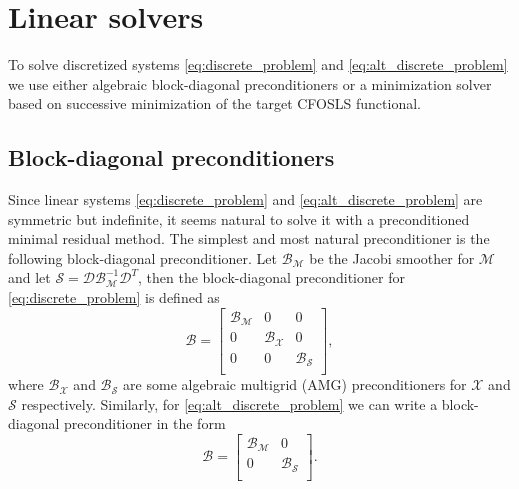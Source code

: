 \documentclass[a4paper,12pt]{amsart}
\numberwithin{equation}{section}
\newcommand{\B}{{\mathcal B}}
\newcommand{\D}{{\mathcal D}}
\newcommand{\M}{{\mathcal M}}
\newcommand{\X}{{\mathcal X}}
\newcommand{\calS}{{\mathcal S}}
\begin{document}
%
%

\section{Linear solvers}

To solve discretized systems \eqref{eq:discrete_problem} and \eqref{eq:alt_discrete_problem} we use either algebraic block-diagonal preconditioners or a minimization solver based on successive minimization of the target CFOSLS functional.

\subsection{Block-diagonal preconditioners} 
\label{sec:blkdiag}

Since linear systems \eqref{eq:discrete_problem} and \eqref{eq:alt_discrete_problem} are symmetric but indefinite, it seems natural to solve it with a preconditioned minimal residual method. The simplest and most natural preconditioner is the following block-diagonal preconditioner. Let $\B_\M$ be the Jacobi smoother for $\M$ and let $\calS = \D\B_\M^{-1}\D^T$, then the block-diagonal preconditioner for \eqref{eq:discrete_problem} is defined as
\begin{equation*}
\B = \begin{bmatrix}
\B_\M & 0 & 0 \\
0 & \B_\X & 0 \\
0 & 0 & \B_\calS \\
\end{bmatrix},
\end{equation*}
where $\B_\X$ and $\B_\calS$ are some algebraic multigrid (AMG) preconditioners for $\X$ and $\calS$ respectively. Similarly, for \eqref{eq:alt_discrete_problem} we can write a block-diagonal preconditioner in the form
\begin{equation*}
\B = \begin{bmatrix}
\B_\M & 0 \\
0 & \B_\calS \\
\end{bmatrix}.
\end{equation*}
\end{document}
